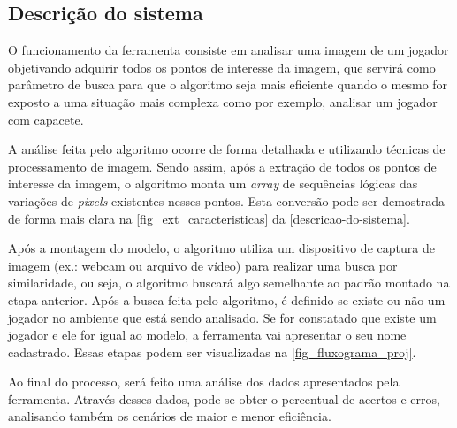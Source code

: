 \subsection{{Descrição do sistema}}

O funcionamento da ferramenta consiste em analisar uma imagem de um jogador objetivando adquirir todos os pontos de interesse da imagem, que servirá como parâmetro de busca para que o algoritmo seja mais eficiente quando o mesmo for exposto a uma situação mais complexa como por exemplo, analisar um jogador com capacete.

A análise feita pelo algoritmo ocorre de forma detalhada e utilizando técnicas de processamento de imagem. Sendo assim, após a extração de todos os pontos de interesse da imagem, o algoritmo monta um \textit{array} de sequências lógicas das variações de \textit{pixels} existentes nesses pontos. Esta conversão pode ser demostrada de forma mais clara na \autoref{fig_ext_caracteristicas} da \autoref{descricao-do-sistema}.

Após a montagem do modelo, o algoritmo utiliza um dispositivo de captura de imagem (ex.: webcam ou arquivo de vídeo) para realizar uma busca por similaridade, ou seja, o algoritmo buscará algo semelhante ao padrão montado na etapa anterior. Após a busca feita pelo algoritmo, é definido se existe ou não um jogador no ambiente que está sendo analisado. Se for constatado que existe um jogador e ele for igual ao modelo, a ferramenta vai apresentar o seu nome cadastrado. Essas etapas podem ser visualizadas na \autoref{fig_fluxograma_proj}.


Ao final do processo, será feito uma análise dos dados apresentados pela ferramenta. Através desses dados, pode-se obter o percentual de acertos e erros, analisando também os cenários de maior e menor eficiência.